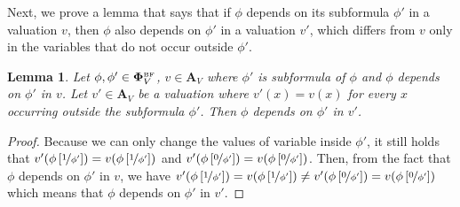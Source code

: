 \documentclass[
  digital, %
  color,
  twoside, %
  table,   %
  nolof,     %
  nolot,     %
]{fithesis3}
\newtheorem{lemma}[theorem]{Lemma}         %
\theoremstyle{definition}
\theoremstyle{remark}
\newcommand{\substitute}[2]{\left[ \nicefrac{#2}{#1} \right]}
\newcommand{\BF}[1]{\mathbf{\Phi}_{#1}^{\normalfont{\text{\tiny BF}}}}
\newcommand{\valtns}[1]{\mathbf{A}_{#1}}
\begin{document}
Next, we prove a lemma that says that if $\phi$ depends on its subformula $\phi'$ in a valuation $v$, then $\phi$ also depends on $\phi'$ in a valuation $v'$, which differs from $v$ only in the variables that do not occur outside $\phi'$.
\begin{lemma}
  \label{lemma:dependschangedval}
  Let $\phi, \phi' \in \BF{V}$, $v \in \valtns{V}$ where $\phi'$ is subformula of $\phi$ and $\phi$ depends on $\phi'$ in $v$. Let $v' \in \valtns{V}$ be a valuation where $v'(x) = v(x)$ for every $x$ occurring outside the subformula $\phi'$. Then $\phi$ depends on $\phi'$ in $v'$.
\end{lemma}
\begin{proof}
  Because we can only change the values of variable inside $\phi'$, it still holds that $v'(\phi\substitute{\phi'}{1}) = v(\phi\substitute{\phi'}{1})$ and $v'(\phi\substitute{\phi'}{0}) = v(\phi\substitute{\phi'}{0})$. Then, from the fact that $\phi$ depends on $\phi'$ in $v$, we have $v'(\phi\substitute{\phi'}{1}) = v(\phi\substitute{\phi'}{1}) \not= v'(\phi\substitute{\phi'}{0}) = v(\phi\substitute{\phi'}{0})$ which means that $\phi$ depends on $\phi'$ in $v'$.
\end{proof}
\end{document}
